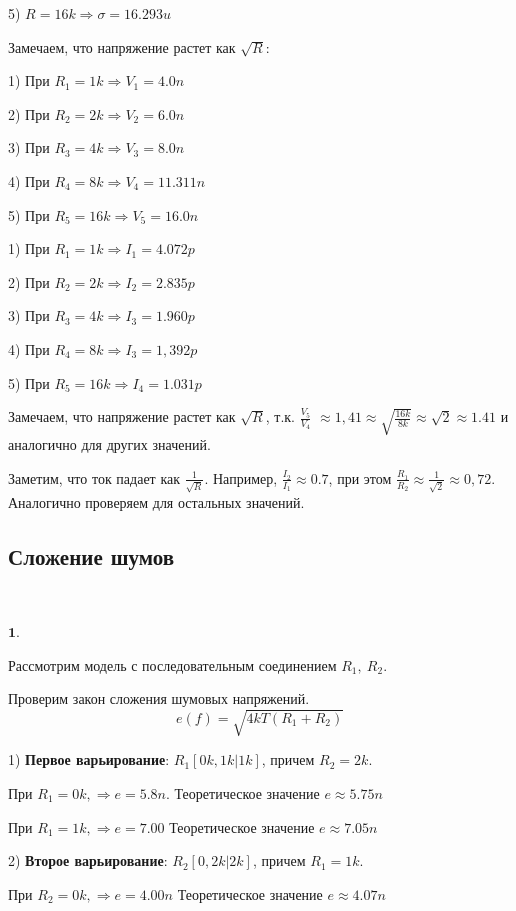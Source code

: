 \documentclass[a4paper, 14pt]{extarticle}%
\begin{document}
5) $R = 16k \Rightarrow \sigma = 16.293u$


Замечаем, что напряжение растет как $\sqrt{R}$:

1) При $R_1 = 1k \Rightarrow  V_1 = 4.0n$

2) При $R_2 = 2k \Rightarrow  V_2 = 6.0n$

3) При $R_3 = 4k \Rightarrow  V_3 = 8.0n$

4) При $R_4 = 8k \Rightarrow  V_4 = 11.311n$

5) При $R_5 = 16k \Rightarrow  V_5 = 16.0n$

1) При $R_1 = 1k \Rightarrow  I_1 = 4.072p$

2) При $R_2 = 2k \Rightarrow  I_2 = 2.835p$

3) При $R_3 = 4k \Rightarrow  I_3 = 1.960p$

4) При $R_4 = 8k \Rightarrow  I_3 = 1,392p$

5) При $R_5 = 16k \Rightarrow  I_4 = 1.031p$


Замечаем, что напряжение растет как $\sqrt{R}$, т.к. $\frac{V_5}{V_4}$ $\approx 1,41 \approx \sqrt{\frac{16k}{8k}} \approx \sqrt{2} \approx 1.41$ и аналогично для других значений.

Заметим, что ток падает как $\frac{1}{\sqrt{R}}$.
Например, $\frac{I_2}{I_1} \approx 0.7$, при этом $\frac{R_1}{R_2} \approx \frac{1}{\sqrt{2}} \approx 0,72$. Аналогично проверяем для остальных значений.


\subsection{Сложение шумов}

$ $

$\textbf{1.}$

Рассмотрим модель с последовательным соединением $R_1, \: R_2$.

Проверим закон сложения шумовых напряжений.
\[ e(f) = \sqrt{4kT(R_1 + R_2)} \]

1) \textbf{Первое варьирование}: $R_1[0k, 1k | 1k]$, причем $R_2 = 2k$.

При $R_1 = 0k, \Rightarrow  e = 5.8n$.
Теоретическое значение $e \approx 5.75n$

При $R_1 = 1k, \Rightarrow  e = 7.00$
Теоретическое значение $e \approx 7.05n$

2) \textbf{Второе варьирование}: $R_2[0, 2k | 2k]$, причем $R_1 = 1k$.

При $R_2 = 0k, \Rightarrow  e = 4.00n$
Теоретическое значение $e \approx 4.07n$
\end{document}
